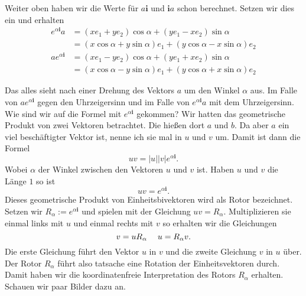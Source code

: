 \documentclass[fleqn]{scrartcl}
\numberwithin{equation}{section}
\def\*#1{\mathbf{#1}}
\begin{document}
Weiter oben haben wir die Werte für $a\*i$ und $\*ia$ schon berechnet. Setzen
wir dies ein und erhalten
\begin{align*}
    e^{\alpha\*i} a &= (xe_1 +ye_2) \cos\alpha + (ye_1 -xe_2) \sin\alpha \\
    &= (x\cos\alpha+y\sin\alpha)e_1 + (y\cos\alpha - x\sin\alpha) e_2 \\
    a e^{\alpha\*i} &= (xe_1 -ye_2)\cos\alpha + (ye_1 + xe_2) \sin\alpha \\
    &= (x\cos\alpha-y\sin\alpha)e_1 + (y\cos\alpha +x\sin\alpha) e_2
\end{align*}

Das alles sieht nach einer Drehung des Vektors $a$ um den Winkel $\alpha$
aus. Im Falle von $ae^{\alpha\*i}$ gegen den Uhrzeigersinn und im Falle von
$e^{\alpha\*i}a$ mit dem Uhrzeigersinn. Wie sind wir auf die Formel mit
$e^{\alpha\*i}$ gekommen? Wir hatten das geometrische Produkt von zwei
Vektoren betrachtet. Die hießen dort $a$ und $b$. Da aber $a$ ein
viel beschäftigter Vektor ist, nenne ich sie mal in $u$ und $v$ um. Damit ist
dann die Formel
\[
    uv=|u||v|e^{\alpha\*i}.
\]
Wobei $\alpha$ der Winkel zwischen den Vektoren $u$ und $v$ ist. Haben $u$ und
$v$ die Länge $1$ so ist
\[
    uv=e^{\alpha\*i}.
\]
Dieses geometrische Produkt von Einheitsbivektoren wird als Rotor bezeichnet.
Setzen wir $R_\alpha := e^{\alpha\*i}$ und spielen mit der Gleichung
$uv=R_\alpha$.  Multiplizieren sie einmal links mit $u$ und einmal rechts mit
$v$ so erhalten wir die Gleichungen
\[
    v = uR_\alpha\hspace{3ex}u = R_\alpha v.
\]
Die erste Gleichung führt den Vektor $u$ in $v$ und die zweite Gleichung $v$ in
$u$ über. Der Rotor $R_\alpha$ führt also tatsache eine Rotation der
Einheitsvektoren durch. Damit haben wir die koordinatenfreie Interpretation des
Rotors $R_\alpha$ erhalten. Schauen wir paar Bilder dazu
an.
\begin{center}
\begin{minipage}{\linewidth}
\centering
{}
\label{fig:rotatealpha}
\end{minipage}
\end{center}
\end{document}
